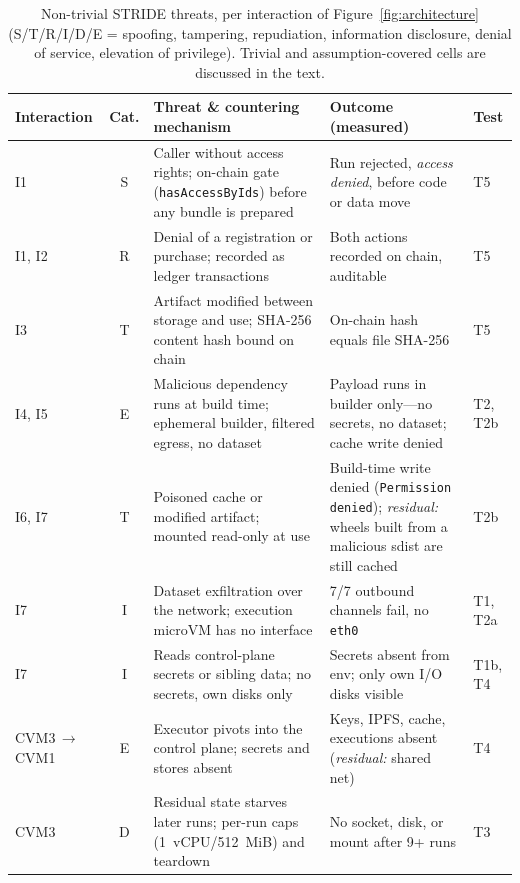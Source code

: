 \begin{table}[htbp]
\centering
\caption{Non-trivial STRIDE threats, per interaction of
Figure~\ref{fig:architecture} (S/T/R/I/D/E = spoofing, tampering, repudiation,
information disclosure, denial of service, elevation of privilege). Trivial and
assumption-covered cells are discussed in the text.}
\label{tab:stride}
\scriptsize
\begin{tabularx}{\textwidth}{@{}p{1.6cm}cXXp{0.8cm}@{}}
\toprule
Interaction & Cat. & Threat \& countering mechanism & Outcome (measured) & Test \\
\midrule
I1 & S & Caller without access rights; on-chain gate (\texttt{hasAccessByIds}) before any bundle is prepared & Run rejected, \emph{access denied}, before code or data move & T5 \\
\addlinespace
I1, I2 & R & Denial of a registration or purchase; recorded as ledger transactions & Both actions recorded on chain, auditable & T5 \\
\addlinespace
I3 & T & Artifact modified between storage and use; SHA-256 content hash bound on chain & On-chain hash equals file SHA-256 & T5 \\
\addlinespace
I4, I5 & E & Malicious dependency runs at build time; ephemeral builder, filtered egress, no dataset & Payload runs in builder only---no secrets, no dataset; cache write denied & T2, T2b \\
\addlinespace
I6, I7 & T & Poisoned cache or modified artifact; mounted read-only at use & Build-time write denied (\texttt{Permission denied}); \emph{residual:} wheels built from a malicious sdist are still cached & T2b \\
\addlinespace
I7 & I & Dataset exfiltration over the network; execution microVM has no interface & 7/7 outbound channels fail, no \texttt{eth0} & T1, T2a \\
\addlinespace
I7 & I & Reads control-plane secrets or sibling data; no secrets, own disks only & Secrets absent from env; only own I/O disks visible & T1b, T4 \\
\addlinespace
CVM3\,$\to$ CVM1 & E & Executor pivots into the control plane; secrets and stores absent & Keys, IPFS, cache, executions absent (\emph{residual:} shared net) & T4 \\
\addlinespace
CVM3 & D & Residual state starves later runs; per-run caps (1~vCPU/512~MiB) and teardown & No socket, disk, or mount after 9+ runs & T3 \\
\bottomrule
\end{tabularx}
\end{table}

